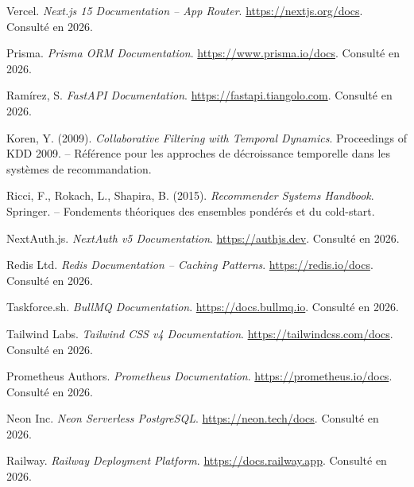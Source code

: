 \documentclass[12pt,a4paper,openany]{report}
\begin{document}
\begin{enumerate}[label={[\arabic*]}]
  \item \label{itm:nextjs} Vercel. \textit{Next.js 15 Documentation -- App Router}. \url{https://nextjs.org/docs}. Consulté en 2026.

  \item \label{itm:prisma} Prisma. \textit{Prisma ORM Documentation}. \url{https://www.prisma.io/docs}. Consulté en 2026.

  \item \label{itm:fastapi} Ramírez, S. \textit{FastAPI Documentation}. \url{https://fastapi.tiangolo.com}. Consulté en 2026.

  \item \label{itm:koren} \label{cite:koren2009} Koren, Y. (2009). \textit{Collaborative Filtering with Temporal Dynamics}. Proceedings of KDD 2009. -- Référence pour les approches de décroissance temporelle dans les systèmes de recommandation.

  \item \label{itm:ricci} Ricci, F., Rokach, L., Shapira, B. (2015). \textit{Recommender Systems Handbook}. Springer. -- Fondements théoriques des ensembles pondérés et du cold-start.

  \item \label{itm:nextauth} NextAuth.js. \textit{NextAuth v5 Documentation}. \url{https://authjs.dev}. Consulté en 2026.

  \item \label{itm:redis} Redis Ltd. \textit{Redis Documentation -- Caching Patterns}. \url{https://redis.io/docs}. Consulté en 2026.

  \item \label{itm:bullmq} Taskforce.sh. \textit{BullMQ Documentation}. \url{https://docs.bullmq.io}. Consulté en 2026.

  \item \label{itm:tailwind} Tailwind Labs. \textit{Tailwind CSS v4 Documentation}. \url{https://tailwindcss.com/docs}. Consulté en 2026.

  \item \label{itm:prometheus} Prometheus Authors. \textit{Prometheus Documentation}. \url{https://prometheus.io/docs}. Consulté en 2026.

  \item \label{itm:neon} Neon Inc. \textit{Neon Serverless PostgreSQL}. \url{https://neon.tech/docs}. Consulté en 2026.

  \item \label{itm:railway} Railway. \textit{Railway Deployment Platform}. \url{https://docs.railway.app}. Consulté en 2026.
\end{enumerate}

\end{document}
